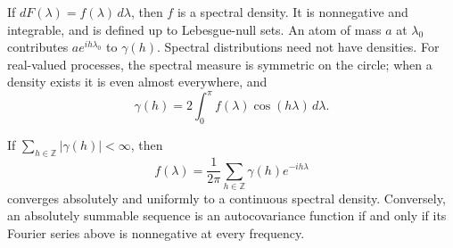 \begin{definition}
If $dF(\lambda)=f(\lambda)\,d\lambda$, then $f$ is a spectral density.
It is nonnegative and integrable, and is defined up to Lebesgue-null sets.
An atom of mass $a$ at $\lambda_0$ contributes $a e^{ih\lambda_0}$ to
$\gamma(h)$. Spectral distributions need not have densities.
For real-valued processes, the spectral measure is symmetric on the circle;
when a density exists it is even almost everywhere, and
\[
\gamma(h)=2\int_0^\pi f(\lambda)\cos(h\lambda)\,d\lambda.
\]
\end{definition}
\begin{theorem}
If $\sum_{h\in\mathbb Z}|\gamma(h)|<\infty$, then
\[
f(\lambda)=\frac1{2\pi}\sum_{h\in\mathbb Z}\gamma(h)e^{-ih\lambda}
\]
converges absolutely and uniformly to a continuous spectral density.
Conversely, an absolutely summable sequence is an autocovariance function
if and only if its Fourier series above is nonnegative at every frequency.
\end{theorem}


